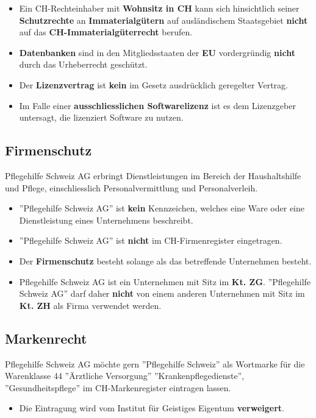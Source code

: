 \begin{itemize}
	\item Ein CH-Rechteinhaber mit \textbf{Wohnsitz in CH} kann sich hinsichtlich seiner \textbf{Schutzrechte} an \textbf{Immaterialgütern} auf ausländischem Staatsgebiet \textbf{nicht} auf das \textbf{CH-Immaterialgüterrecht} berufen.
	\item \textbf{Datenbanken} sind in den Mitgliedsstaaten der \textbf{EU} vordergründig \textbf{nicht} durch das Urheberrecht geschützt.
	\item Der \textbf{Lizenzvertrag} ist \textbf{kein} im Gesetz ausdrücklich geregelter Vertrag.
	\item Im Falle einer \textbf{ausschliesslichen Softwarelizenz} ist es dem Lizenzgeber untersagt, die lizenziert Software zu nutzen.
\end{itemize}

\subsection{Firmenschutz}
Pflegehilfe Schweiz AG erbringt Dienstleistungen im Bereich der Haushaltshilfe und Pflege, einschliesslich Personalvermittlung und Personalverleih.
\begin{itemize}
	\item ''Pflegehilfe Schweiz AG'' ist \textbf{kein} Kennzeichen, welches eine Ware oder eine Dienstleistung eines Unternehmens beschreibt.
	\item ''Pflegehilfe Schweiz AG'' ist \textbf{nicht} im CH-Firmenregister eingetragen.
	\item Der \textbf{Firmenschutz} besteht solange als das betreffende Unternehmen besteht.
	\item Pflegehilfe Schweiz AG ist ein Unternehmen mit Sitz im \textbf{Kt. ZG}. ''Pflegehilfe Schweiz AG'' darf daher \textbf{nicht} von einem anderen Unternehmen mit Sitz im \textbf{Kt. ZH} als Firma verwendet werden.
\end{itemize}

\subsection{Markenrecht}
Pflegehilfe Schweiz AG möchte gern ''Pflegehilfe Schweiz'' als Wortmarke für die Warenklasse 44 ''Ärztliche Versorgung'' ''Krankenpflegedienste'', ''Gesundheitspflege'' im CH-Markenregister eintragen lassen.
\begin{itemize}
	\item Die Eintragung wird vom Institut für Geistiges Eigentum \textbf{verweigert}.
\end{itemize}

